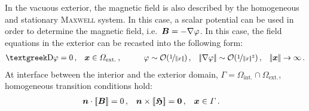 In the vacuous exterior, the magnetic field is also described by the homogeneous and stationary \textsc{Maxwell} system. In this case, a scalar potential can be used in order to determine the magnetic field, i.e.\ $\bm{B}=-\nabla \varphi$. In this case, the field equations in the exterior can be recasted into the following form:
\begin{equation}
\begin{aligned}
	\laplace \vp&=0\,, & \bm{x}&\in\varOmega_\mathrm{ext.}\,, \qquad&
	\vp&\sim \mathcal{O}(\nicefrac{1}{\norm{x}})\,, &
	\norm{\nabla \vp}&\sim \mathcal{O}(\nicefrac{1}{\norm{x}^2})\,, &
	\norm{\bm{x}}\to \infty\,.
\end{aligned}
\end{equation}
At interface between the interior and the exterior domain, $\varGamma=\varOmega_\mathrm{int.}\cap\varOmega_\mathrm{ext.}$, homogeneous transition conditions hold:
\begin{equation}\label{eqn:JumpCondition}
\begin{aligned}
	\bm{n}\cdot\left[\!\left[\bm{B}\right]\!\right]&=0\,, &
	\bm{n}\times\left[\!\left[\bm{\mathfrak{H}}\right]\!\right]&=\bm{0}\,, &
	\bm{x}&\in\varGamma\,.
\end{aligned}
\end{equation}

